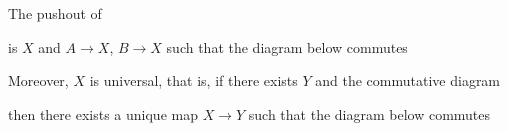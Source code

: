 \documentclass{report}
\begin{document}
\begin{definition}[pushout]
    The pushout of  is $X$ and $A \to X$, $B \to X$ such that the diagram below commutes
    \begin{center}
    \end{center}
    Moreover, $X$ is universal, that is, if there exists $Y$ and the commutative diagram 
    \begin{center}
    \end{center}
    then there exists a unique map $X \to Y$ such that the diagram below commutes
    \begin{center}
    \end{center}
\end{definition}
\end{document}
